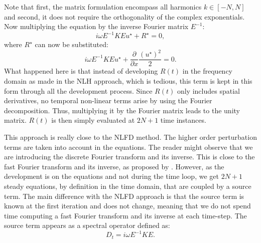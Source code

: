 Note that first, the matrix formulation encompass all harmonics
$k \in [-N, N]$ and second, it does not require the
orthogonality of the complex exponentials.
Now multiplying the equation by the inverse Fourier matrix $E^{-1}$:
\begin{equation}
	i \omega E^{-1} K E u^\star + R^\star = 0,
	\label{eq:sm_hb_matrix_form_mono}
\end{equation}
where $R^\star$ can now be substituted:
\begin{equation}
		i \omega E^{-1} K E u^\star + 
		\displaystyle \frac{\partial}{\partial x}
		\frac{(u^\star)^2}{2} = 0.
\end{equation}
What happened here is that instead of developing $R(t)$
in the frequency domain as made in the NLH approach,
which is tedious, this term is kept
in this form through all the development process. 
Since $R(t)$ only includes spatial derivatives, no temporal non-linear
terms
arise by using the Fourier decomposition. Thus, multiplying it
by the Fourier matrix leads to the unity matrix. 
$R(t)$ is then simply evaluated at $2N+1$ time instances.

This approach is really close to the NLFD method.
The higher order perturbation terms are taken into account
in the equations.
The reader might observe that we are introducing the discrete Fourier
transform and its inverse. This is close to the fast Fourier transform
and its inverse, as proposed by \citet{McMullen2001}. However,
as the development is on the equations and not during the time loop,
we get $2N+1$ steady equations, by definition in the time
domain, that are coupled by a source term.
The main difference with the NLFD approach
is that the source term is known at the first iteration and does
not change, meaning that we do not spend time computing a
fast Fourier transform and its inverse at each time-step.
The source term appears as a spectral operator defined as:
\begin{equation}
	D_t = i \omega E^{-1} K E.
	\label{eq:sm_hb_mono_source_term_matrix}
\end{equation}

